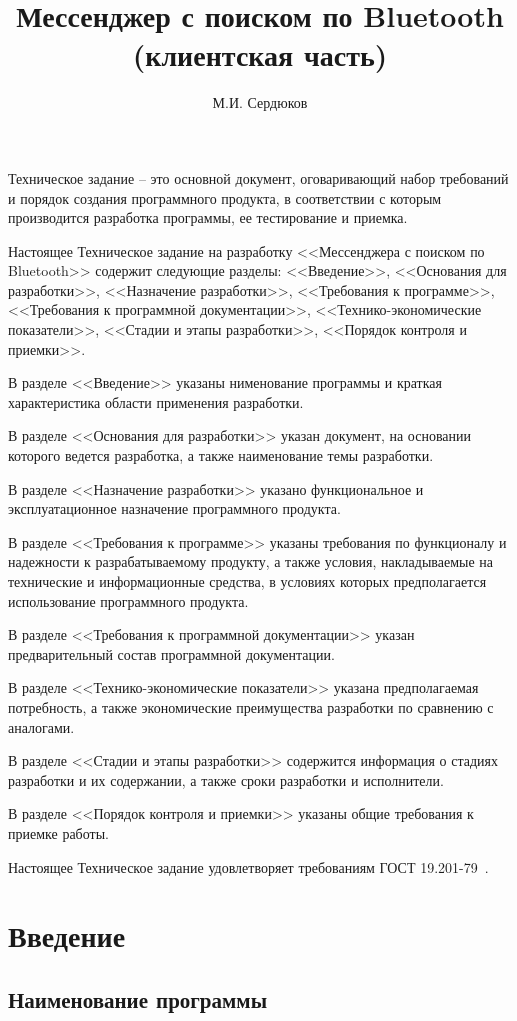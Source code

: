 \documentclass[techtask]{espd}
\author{М.И. Сердюков}
\title{Мессенджер с поиском по Bluetooth\\(клиентская часть)}
\begin{document}
\annotation
Техническое задание -- это основной документ, оговаривающий набор требований и порядок создания программного продукта, в соответствии с которым производится разработка программы, ее тестирование и приемка.

Настоящее Техническое задание на разработку <<Мессенджера с поиском по Bluetooth>> содержит следующие разделы: <<Введение>>, <<Основания для разработки>>, <<Назначение разработки>>, <<Требования к программе>>, <<Требования к программной документации>>, <<Технико-экономические показатели>>, <<Стадии и этапы разработки>>, <<Порядок контроля и приемки>>.

В разделе <<Введение>> указаны нименование программы и краткая характеристика области применения разработки.

В разделе <<Основания для разработки>> указан документ, на основании которого ведется разработка, а также наименование темы разработки.

В разделе <<Назначение разработки>> указано функциональное и эксплуатационное назначение программного продукта.

В разделе <<Требования к программе>> указаны требования по функционалу и надежности к разрабатываемому продукту, а также условия, накладываемые на технические и информационные средства, в условиях которых предполагается использование программного продукта.

В разделе <<Требования к программной документации>> указан предварительный состав программной документации.

В разделе <<Технико-экономические показатели>> указана предполагаемая потребность, а также экономические преимущества разработки по сравнению с аналогами.

В разделе <<Стадии и этапы разработки>> содержится информация о стадиях разработки и их содержании, а также сроки разработки и исполнители.

В разделе <<Порядок контроля и приемки>> указаны общие требования к приемке работы.

Настоящее Техническое задание удовлетворяет требованиям ГОСТ 19.201-79~\cite{espd201}.

\tableofcontents

\section{Введение}
\subsection{Наименование программы}
\end{document}
